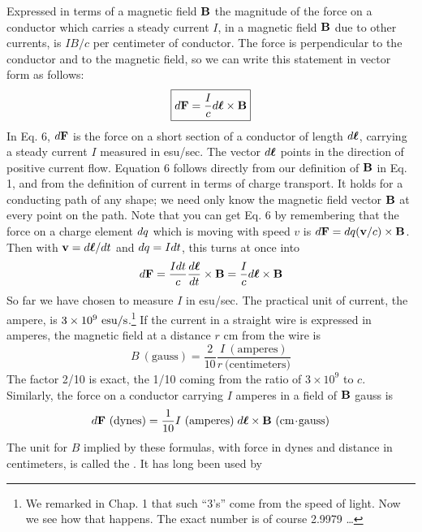 Expressed in terms of a magnetic field $\mathbf{B}$ the magnitude of the force
on a conductor which carries a steady current $I$, in a magnetic field $\mathbf{B}$
due to other currents, is $IB/c$ per centimeter of conductor. The force
is perpendicular to the conductor and to the magnetic field, so we
can write this statement in vector form as follows:
\begin{equation}
\boxed{
  d\mathbf{F} = \frac{I}{c} d\boldsymbol{\ell}\times\mathbf{B}
}
\end{equation}
In Eq. 6, $d\mathbf{F}$ is the force on a short section of a conductor of length $d\boldsymbol{\ell}$,
carrying a steady current $I$ measured in esu/sec. The vector $d\boldsymbol{\ell}$ points
in the direction of positive current flow. Equation 6 follows directly
from our definition of $\mathbf{B}$ in Eq. 1, and from the definition of current
in terms of charge transport. It holds for a conducting path of any
shape; we need only know the magnetic field vector $\mathbf{B}$ at every point
on the path. Note that you can get Eq. 6 by remembering that the
force on a charge element $d q$ which is moving with speed $v$ is
$d\mathbf{F} = d q(\mathbf{v}/c) \times \mathbf{B}$. Then with $\mathbf{v} = d\boldsymbol{\ell}/d t$
and $d q = I d t$, this turns at once into
\begin{equation}
  d\mathbf{F} = \frac{I d t}{c} \frac{d\boldsymbol{\ell}}{d t} \times \mathbf{B} = \frac{I}{c} d\boldsymbol{\ell}\times\mathbf{B}
\end{equation}
So far we have chosen to measure $I$ in esu/sec. The practical unit
of current, the ampere, is $3 \times 10^9\ \textup{esu}/\textup{s}$.\footnote{We
remarked in Chap. 1 that such ``3's'' come from the speed of light. Now we
see how that happens. The exact number is of course 2.9979 \ldots
} If the current in a
straight wire is expressed in amperes, the magnetic field at a distance
$r$ cm from the wire is
\begin{equation}
  B\ (\text{gauss}) = \frac{2}{10}\frac{I\ (\text{amperes})}{r\ \text{(centimeters)}}
\end{equation}
The factor 2/10 is exact, the 1/10 coming from the ratio of $3 \times 10^9$
to $c$. Similarly, the force on a conductor carrying $I$ amperes in a field
of $\mathbf{B}$ gauss is
\begin{equation}
  \der\vc{F}\ (\text{dynes}) 
        = \frac{1}{10}I\ (\text{amperes})\; \der\bell \times \vc{B}\ (\cmunit\unitdot\zu{gauss})
\end{equation}
The unit for $B$ implied by these formulas, with force in dynes and
distance in centimeters, is called the . It has long been used by
